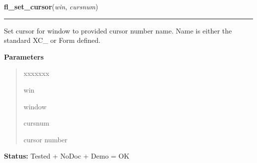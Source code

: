 \hspace{.8\funcindent}\begin{boxedminipage}{\funcwidth}

    \raggedright \textbf{fl\_set\_cursor}(\textit{win}, \textit{cursnum})

    \vspace{-1.5ex}

    \rule{\textwidth}{0.5\fboxrule}
\setlength{\parskip}{2ex}
    Set cursor for window to provided cursor number name. Name is either 
    the standard XC\_ or Form defined.

\setlength{\parskip}{1ex}
      \textbf{Parameters}
      \vspace{-1ex}

      \begin{quote}
        \begin{Ventry}{xxxxxxx}

          \item[win]

          window

          \item[cursnum]

          cursor number

        \end{Ventry}

      \end{quote}

\textbf{Status:} Tested + NoDoc + Demo = OK



    \end{boxedminipage}

    \label{xformslib:library:fl_set_cursor_color}

    \vspace{0.5ex}

